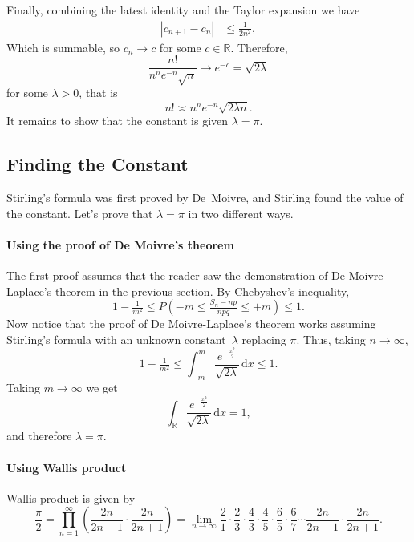 \documentclass[12pt]{article}
\theoremstyle{definition}
\newcommand{\dd}{\mathrm{d}}
\newcommand{\R}{\mathbb{R}}
\renewcommand{\leq}{\leqslant}
\begin{document}
Finally, combining the latest identity and the Taylor expansion we have
\begin{align*}
|c_{n+1}-c_n|
& \leq
\tfrac{1}{2 n^2}
,
\end{align*}
Which is summable, so $c_n \to c$ for some $c \in \R$.
Therefore,
\[
\frac{n!}{n^n e^{-n} \sqrt{n}} \to e^{-c} = \sqrt{2 \lambda}
\]
for some $\lambda>0$, that is
\[
{n!} \asymp n^n e^{-n} \sqrt{2 \lambda n}
.
\]
It remains to show that the constant is given $\lambda=\pi$.

\subsection*{Finding the Constant}

Stirling's formula was first proved by De~Moivre, and Stirling found the value of the constant.
Let's prove that $\lambda=\pi$ in two different ways.

\paragraph{Using the proof of De Moivre's theorem}

The first proof assumes that the reader saw the demonstration of De Moivre-Laplace's theorem in the previous section.
By Chebyshev's inequality,
\[
1 - \tfrac{1}{m^2} \leq P \left( -m \leq \tfrac{S_n - np}{npq} \leq +m \right) \leq 1
.
\]
Now notice that the proof of De Moivre-Laplace's theorem works assuming Stirling's formula with an unknown constant~$\lambda$ replacing $\pi$.
Thus, taking $n\to\infty$,
\[
1 - \tfrac{1}{m^2} \leq \int_{-m}^{m} \frac{e^{-\frac{x^2}{2}}}{\sqrt{2 \lambda}}\, \dd x \leq 1
.
\]
Taking $m \to \infty$ we get
\[
\int_{\R} \frac{e^{-\frac{x^2}{2}}}{\sqrt{2 \lambda}}\, \dd x = 1
,
\]
and therefore $\lambda=\pi$.

\paragraph{Using Wallis product}
Wallis product is given by
\[
\frac{\pi}{2}
=
\prod_{n=1}^{\infty} \left( \frac{2n}{2n-1} \cdot \frac{2n}{2n+1} \right)
=
\lim_{n\to\infty}
\frac{2}{1}
\cdot
\frac{2}{3}
\cdot
\frac{4}{3}
\cdot
\frac{4}{5}
\cdot
\frac{6}{5}
\cdot
\frac{6}{7}
\cdots
\frac{2n}{2n-1}
\cdot
\frac{2n}{2n+1}
.
\]
\end{document}
